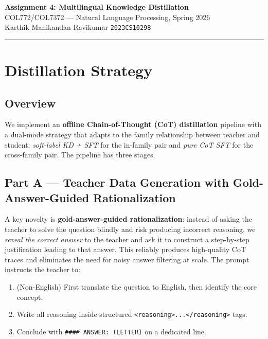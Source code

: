 \documentclass[11pt,a4paper]{article}
\begin{document}
\begin{center}
  {\LARGE\bfseries Assignment 4: Multilingual Knowledge Distillation}\\[4pt]
  {\large COL772/COL7372 --- Natural Language Processing, Spring 2026}\\[3pt]
  {\normalsize Karthik Manikandan Ravikumar \quad \texttt{2023CS10298}}
\end{center}

\vspace{-2pt}
\noindent\rule{\linewidth}{0.5pt}
\vspace{2pt}

\section{Distillation Strategy}

\subsection{Overview}

We implement an \textbf{offline Chain-of-Thought (CoT) distillation} pipeline with a
dual-mode strategy that adapts to the family relationship between teacher and student:
\emph{soft-label KD + SFT} for the in-family pair and \emph{pure CoT SFT} for the
cross-family pair.  The pipeline has three stages.

\subsection{Part A — Teacher Data Generation with Gold-Answer-Guided Rationalization}

A key novelty is \textbf{gold-answer-guided rationalization}: instead of asking the teacher
to solve the question blindly and risk producing incorrect reasoning, we \emph{reveal the
correct answer} to the teacher and ask it to construct a step-by-step justification leading
to that answer.  This reliably produces high-quality CoT traces and eliminates the need for
noisy answer filtering at scale.  The prompt instructs the teacher to:

\begin{enumerate}
  \item (Non-English) First translate the question to English, then identify the core concept.
  \item Write all reasoning inside structured \texttt{<reasoning>...</reasoning>} tags.
  \item Conclude with \texttt{\#\#\#\# ANSWER: (LETTER)} on a dedicated line.
\end{enumerate}
\end{document}
